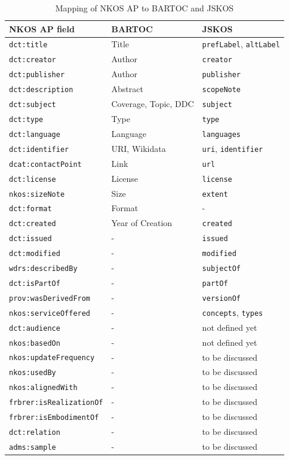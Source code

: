 \documentclass[12pt,a4paper]{llncs}
\begin{document}
\begin{table}\centering
\caption{Mapping of NKOS AP to BARTOC and JSKOS}
\label{tab:nkosap}
\begin{tabular}{lll}
NKOS AP field & BARTOC & JSKOS \\
\hline	
\verb|dct:title| 		& Title  	& \verb|prefLabel|, \verb|altLabel| \\
\verb|dct:creator| 		& Author 	& \verb|creator| \\
\verb|dct:publisher| 	& Author	& \verb|publisher| \\
\verb|dct:description| 	& Abstract  & \verb|scopeNote| \\
\verb|dct:subject| 		& Coverage, Topic, DDC & \verb|subject| \\
\verb|dct:type| 		& Type 		& \verb|type| \\
\verb|dct:language| 	& Language  & \verb|languages| \\
\verb|dct:identifier| 	& URI, Wikidata & \verb|uri|, \verb|identifier| \\
\verb|dcat:contactPoint| & Link     & \verb|url| \\
\verb|dct:license| 		& License 	& \verb|license| \\
\verb|nkos:sizeNote| 	& Size		& \verb|extent| \\
\verb|dct:format| 		& Format	& - \\
\verb|dct:created|		& Year of Creation & \verb|created| \\
\verb|dct:issued| 		& - 		& \verb|issued| \\
\verb|dct:modified|		& - 		& \verb|modified| \\
\verb|wdrs:describedBy| & -         & \verb|subjectOf| \\
\verb|dct:isPartOf| 		& - 	& \verb|partOf| \\
\verb|prov:wasDerivedFrom| & - 		& \verb|versionOf| \\
\verb|nkos:serviceOffered| & - 		& \verb|concepts|, \verb|types| \\
\verb|dct:audience| & - 			& not defined yet \\
\verb|nkos:basedOn| 	& - 		& not defined yet \\
\verb|nkos:updateFrequency| & - 	& to be discussed \\
\verb|nkos:usedBy| & - 				& to be discussed \\
\verb|nkos:alignedWith| 	& -		& to be discussed \\
\verb|frbrer:isRealizationOf| & - 	& to be discussed \\
\verb|frbrer:isEmbodimentOf| & - 	& to be discussed \\
\verb|dct:relation| 		 & - 	& to be discussed \\
\verb|adms:sample| 			 & - 	& to be discussed \\
\hline
\end{tabular}
\vspace{-7mm}
\end{table}
\end{document}
